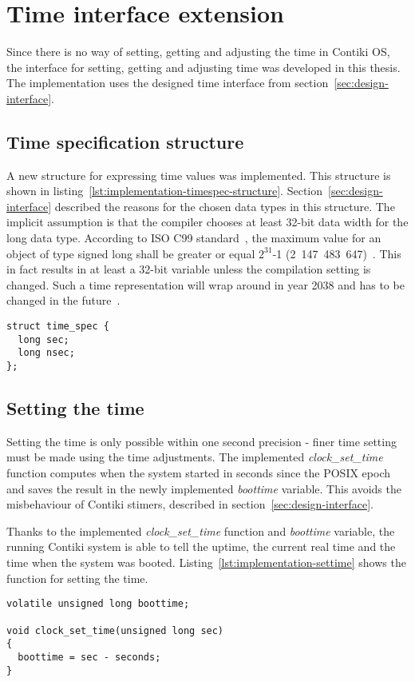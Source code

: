 
\section{Time interface extension}
Since there is no way of setting, getting and adjusting the time in Contiki OS,
the interface for setting, getting and adjusting time was developed in this thesis.
The implementation uses the designed time interface from section~\ref{sec:design-interface}.

\subsection{Time specification structure}
A new structure for expressing time values was implemented.
This structure is shown in listing~\ref{lst:implementation-timespec-structure}.
Section~\ref{sec:design-interface} described the reasons for the chosen data types
in this structure.
The implicit assumption is that the compiler chooses at least 32-bit data width for the long data type.
According to ISO C99 standard~\cite{c99},
the maximum value for an object of type signed long
shall be greater or equal $2^{31}$-1 (2~147~483~647)~\cite{c99}.
This in fact results in at least a 32-bit variable unless the compilation setting is changed.
Such a time representation will wrap around in year 2038
and has to be changed in the future~\cite{posix}.
\begin{lstlisting}[caption={Time specification structure},label={lst:implementation-timespec-structure}]
struct time_spec {
  long sec;
  long nsec;
};
\end{lstlisting}


\subsection{Setting the time}
Setting the time is only possible within one second precision -
finer time setting must be made using the time adjustments.
The implemented {\it{clock\_set\_time}} function computes when the system started
in seconds since the POSIX epoch and saves the result in the newly implemented {\it{boottime}} variable.
This avoids the misbehaviour of Contiki stimers, described in section~\ref{sec:design-interface}.

Thanks to the implemented {\it{clock\_set\_time}} function and {\it{boottime}} variable,
the running Contiki system is able to tell the uptime, the current real time and the time when the system was booted.
Listing~\ref{lst:implementation-settime} shows the function for setting the time.
\begin{lstlisting}[caption={Function for setting the time},label={lst:implementation-settime}]
volatile unsigned long boottime;

void clock_set_time(unsigned long sec)
{
  boottime = sec - seconds;
}
\end{lstlisting}


